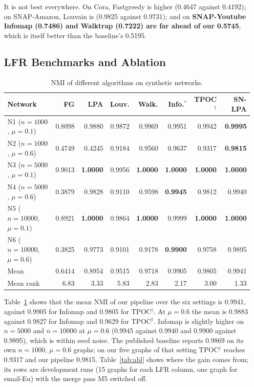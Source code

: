 \documentclass[conference]{IEEEtran}
\begin{document}
It is not best everywhere. On Cora, Fastgreedy is higher (0.4647 against 0.4192); on SNAP-Amazon, Louvain is (0.9825 against 0.9731); and on \textbf{SNAP-Youtube Infomap (0.7486) and Walktrap (0.7222) are far ahead of our 0.5745}, which is itself better than the baseline's 0.5195.

\subsection{LFR Benchmarks and Ablation}
\begin{table}[t]
\centering
\caption{NMI of different algorithms on synthetic networks.}
\label{tab:lfr}
\scriptsize
\begin{tabular}{lrrrrrrr}
\toprule
Network & FG & LPA & Louv. & Walk. & Info.$^{*}$ & TPOC$^{\dagger}$ & SN-LPA \\
\midrule
N1 ($n{=}1000$, $\mu{=}0.1$) & 0.8098 & 0.9880 & 0.9872 & 0.9969 & 0.9951 & 0.9942 & \textbf{0.9995} \\
N2 ($n{=}1000$, $\mu{=}0.6$) & 0.4749 & 0.4245 & 0.9184 & 0.9560 & 0.9637 & 0.9317 & \textbf{0.9815} \\
N3 ($n{=}5000$, $\mu{=}0.1$) & 0.9013 & \textbf{1.0000} & 0.9956 & \textbf{1.0000} & \textbf{1.0000} & \textbf{1.0000} & \textbf{1.0000} \\
N4 ($n{=}5000$, $\mu{=}0.6$) & 0.3879 & 0.9828 & 0.9110 & 0.9598 & \textbf{0.9945} & 0.9812 & 0.9940 \\
N5 ($n{=}10000$, $\mu{=}0.1$) & 0.8921 & \textbf{1.0000} & 0.9864 & \textbf{1.0000} & 0.9999 & \textbf{1.0000} & \textbf{1.0000} \\
N6 ($n{=}10000$, $\mu{=}0.6$) & 0.3825 & 0.9773 & 0.9101 & 0.9178 & \textbf{0.9900} & 0.9758 & 0.9895 \\
\midrule
Mean & 0.6414 & 0.8954 & 0.9515 & 0.9718 & 0.9905 & 0.9805 & 0.9941 \\
Mean rank & 6.83 & 3.33 & 5.83 & 2.83 & 2.17 & 3.00 & 1.33 \\
\bottomrule
\end{tabular}
\end{table}
Table~\ref{tab:lfr} shows that the mean NMI of our pipeline over the six settings is 0.9941, against 0.9905 for Infomap and 0.9805 for TPOC$^{\dagger}$. At $\mu{=}0.6$ the mean is 0.9883 against 0.9827 for Infomap and 0.9629 for TPOC$^{\dagger}$. Infomap is slightly higher on $n{=}5000$ and $n{=}10000$ at $\mu{=}0.6$ (0.9945 against 0.9940 and 0.9900 against 0.9895), which is within seed noise. The published baseline reports 0.9869 on its own $n{=}1000$, $\mu{=}0.6$ graphs; on our five graphs of that setting TPOC$^{\dagger}$ reaches 0.9317 and our pipeline 0.9815. Table~\ref{tab:abl} shows where the gain comes from; its rows are development runs (15 graphs for each LFR column, one graph for email-Eu) with the merge pass M5 switched off.
\end{document}
